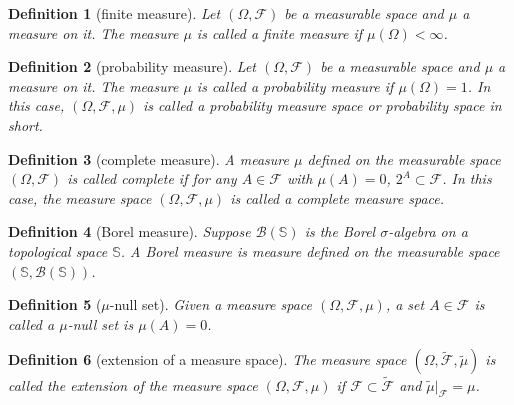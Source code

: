 \documentclass{report}
\newtheorem{definition}{Definition}[section]
\theoremstyle{nonumberplain}
\begin{document}
\begin{definition}[finite measure]
	Let $(\Omega,{\mathcal {F}})$ be a measurable space and $\mu$ a measure on it. The measure $\mu$ is called a \emph{finite measure} if $\mu(\Omega)<\infty$.
\end{definition}

\begin{definition}[probability measure]
	Let $(\Omega,{\mathcal {F}})$ be a measurable space and $\mu$ a measure on it. The measure $\mu$ is called a \emph{probability measure} if $\mu(\Omega)=1$. In this case, $(\Omega,{\mathcal {F}},\mu)$ is called a \emph{probability measure space} or \emph{probability space} in short.
\end{definition}

\begin{definition}[complete measure]
	A measure $\mu$ defined on the measurable space $(\Omega,\mathcal{F})$ is called \emph{complete} if for any $A \in \mathcal{F}$ with $\mu(A) = 0$, $2^A \subset \mathcal{F}$. In this case, the measure space $(\Omega,\mathcal{F},\mu)$ is called a complete measure space. 
\end{definition}

\begin{definition}[Borel measure]
	Suppose $\mathcal{B}(\mathbb{S})$ is the Borel $\sigma$-algebra on a topological space $\mathbb{S}$. A \emph{Borel measure} is measure defined on the measurable space $(\mathbb{S},\mathcal{B}(\mathbb{S}))$.
\end{definition}

\begin{definition}[$\mu$-null set]
	Given a measure space $(\Omega, \mathcal{F}, \mu)$, a set $A\in  \mathcal{F}$ is called a $\mu$-null set is $\mu(A)=0$.
\end{definition}

\begin{definition}[extension of a measure space]
	The measure space $(\Omega, \widetilde{\mathcal{F}}, \widetilde{\mu})$ is called the extension of the measure space $(\Omega, \mathcal{F}, \mu)$ if $\mathcal{F}\subset\widetilde{\mathcal{F}}$ and $\widetilde{\mu}|_{\mathcal{F}}=\mu$.
\end{definition}
\end{document}
